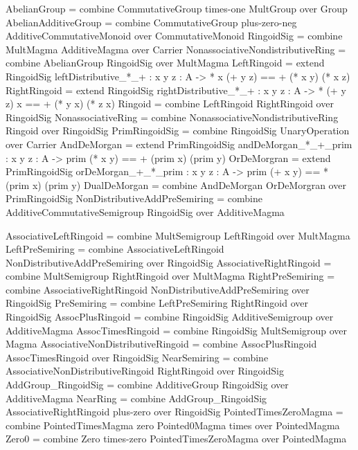 \begin{togcode} 
AbelianGroup = 
  combine CommutativeGroup times-one MultGroup {} over Group
AbelianAdditiveGroup = 
  combine CommutativeGroup plus-zero-neg AdditiveCommutativeMonoid {} 
  over CommutativeMonoid 
RingoidSig = combine MultMagma {} AdditiveMagma {} over Carrier 
NonassociativeNondistributiveRing = 
  combine AbelianGroup {} RingoidSig {} over MultMagma 
LeftRingoid  = 
  extend RingoidSig {leftDistributive_*_+  : {x y z : A} -> 
       * x (+ y z) == + (* x y) (* x z)}
RightRingoid = 
  extend RingoidSig {rightDistributive_*_+ : {x y z : A} -> 
       * (+ y z) x == + (* y x) (* z x)}
Ringoid = combine LeftRingoid {} RightRingoid {} over RingoidSig
NonassociativeRing = 
  combine NonassociativeNondistributiveRing {} Ringoid {} over RingoidSig
PrimRingoidSig = combine RingoidSig {} UnaryOperation {} over Carrier
AndDeMorgan = 
  extend PrimRingoidSig {andDeMorgan_*_+_prim : {x y z : A} -> 
       prim (* x y) == + (prim x) (prim y) }
OrDeMorgran = 
  extend PrimRingoidSig {orDeMorgan_+_*_prim  : {x y z : A} -> 
       prim (+ x y) == * (prim x) (prim y) }
DualDeMorgan = combine AndDeMorgan {} OrDeMorgran {} over PrimRingoidSig
NonDistributiveAddPreSemiring  = 
  combine AdditiveCommutativeSemigroup {} RingoidSig {} over AdditiveMagma  
\end{togcode} 

\begin{togcode} 
AssociativeLeftRingoid = 
  combine MultSemigroup {} LeftRingoid {} over MultMagma 
LeftPreSemiring = 
  combine AssociativeLeftRingoid {} NonDistributiveAddPreSemiring {} 
  over RingoidSig 
AssociativeRightRingoid = 
  combine MultSemigroup {} RightRingoid {} over MultMagma 
RightPreSemiring = 
  combine AssociativeRightRingoid {} NonDistributiveAddPreSemiring {} 
  over RingoidSig 
PreSemiring = combine LeftPreSemiring {} RightRingoid {} over RingoidSig
AssocPlusRingoid  = 
  combine RingoidSig {} AdditiveSemigroup {} over AdditiveMagma
AssocTimesRingoid = combine RingoidSig {} MultSemigroup {} over Magma
AssociativeNonDistributiveRingoid = 
  combine AssocPlusRingoid {} AssocTimesRingoid {} over RingoidSig 
NearSemiring  = 
  combine AssociativeNonDistributiveRingoid {} RightRingoid {} 
  over RingoidSig
AddGroup_RingoidSig = 
  combine AdditiveGroup {} RingoidSig {} over AdditiveMagma 
NearRing = 
  combine AddGroup_RingoidSig {} AssociativeRightRingoid plus-zero 
  over RingoidSig
PointedTimesZeroMagma = 
  combine PointedTimesMagma zero Pointed0Magma times over PointedMagma 
Zero0 = combine Zero times-zero PointedTimesZeroMagma {} over PointedMagma 
\end{togcode} 

